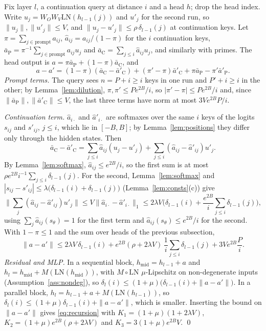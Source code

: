 \documentclass[11pt]{article}
\theoremstyle{definition}
\theoremstyle{remark}
\begin{document}
Fix layer $l$, a continuation query at distance $i$ and a head $h$; drop the head index. Write $u_j=W_OW_V\mathrm{LN}(h_{l-1}(j))$ and $u'_j$ for the second run, so $\|u_j\|,\|u'_j\|\le V$, and $\|u_j-u'_j\|\le\rho\,\delta_{l-1}(j)$ at continuation keys. Let $\pi=\sum_{j\in\text{prompt}}a_{ij}$, $\hat a_{ij}=a_{ij}/(1-\pi)$ for the $i$ continuation keys, $\bar a_{\mathrm P}=\pi^{-1}\sum_{j\in\text{prompt}}a_{ij}u_j$ and $\bar a_{\mathrm C}=\sum_{j\le i}\hat a_{ij}u_j$, and similarly with primes. The head output is $a=\pi\bar a_{\mathrm P}+(1-\pi)\bar a_{\mathrm C}$, and
\[
a-a'=(1-\pi)(\bar a_{\mathrm C}-\bar a'_{\mathrm C})+(\pi'-\pi)\bar a'_{\mathrm C}+\pi\bar a_{\mathrm P}-\pi'\bar a'_{\mathrm P}.
\]
\emph{Prompt terms.} The query sees $n=P+i\ge i$ keys in one run and $P'+i\ge i$ in the other; by Lemma~\ref{lem:dilution}, $\pi,\pi'\le Pe^{2B}/i$, so $|\pi'-\pi|\le Pe^{2B}/i$ and, since $\|\bar a_{\mathrm P}\|,\|\bar a'_{\mathrm C}\|\le V$, the last three terms have norm at most $3Ve^{2B}P/i$.

\emph{Continuation term.} $\hat a_{i\cdot}$ and $\hat a'_{i\cdot}$ are softmaxes over the same $i$ keys of the logits $s_{ij}$ and $s'_{ij}$, $j\le i$, which lie in $[-B,B]$; by Lemma~\ref{lem:positions} they differ only through the hidden states. Then
\[
\bar a_{\mathrm C}-\bar a'_{\mathrm C}=\sum_{j\le i}\hat a_{ij}(u_j-u'_j)+\sum_{j\le i}(\hat a_{ij}-\hat a'_{ij})u'_j .
\]
By Lemma~\ref{lem:softmax}, $\hat a_{ij}\le e^{2B}/i$, so the first sum is at most $\rho e^{2B}i^{-1}\sum_{j\le i}\delta_{l-1}(j)$. For the second, Lemma~\ref{lem:softmax} and $|s_{ij}-s'_{ij}|\le\lambda\big(\delta_{l-1}(i)+\delta_{l-1}(j)\big)$ (Lemma~\ref{lem:consts}(c)) give
\[
\Big\|\sum_j(\hat a_{ij}-\hat a'_{ij})u'_j\Big\|\le V\|\hat a_{i\cdot}-\hat a'_{i\cdot}\|_1\le2\lambda V\Big(\delta_{l-1}(i)+\frac{e^{2B}}{i}\sum_{j\le i}\delta_{l-1}(j)\Big),
\]
using $\sum_j\hat a_{ij}(s_\theta)=1$ for the first term and $\hat a_{ij}(s_\theta)\le e^{2B}/i$ for the second. With $1-\pi\le1$ and the sum over heads of the previous subsection,
\[
\|a-a'\|\le2\lambda V\,\delta_{l-1}(i)+e^{2B}(\rho+2\lambda V)\,\frac1i\sum_{j\le i}\delta_{l-1}(j)+3Ve^{2B}\frac Pi .
\]
\emph{Residual and MLP.} In a sequential block, $h_{\mathrm{mid}}=h_{l-1}+a$ and $h_l=h_{\mathrm{mid}}+M(\mathrm{LN}(h_{\mathrm{mid}}))$, with $M\circ\mathrm{LN}$ $\mu$-Lipschitz on non-degenerate inputs (Assumption~\ref{ass:nondeg}), so $\delta_l(i)\le(1+\mu)\big(\delta_{l-1}(i)+\|a-a'\|\big)$. In a parallel block, $h_l=h_{l-1}+a+M(\mathrm{LN}(h_{l-1}))$, so $\delta_l(i)\le(1+\mu)\delta_{l-1}(i)+\|a-a'\|$, which is smaller. Inserting the bound on $\|a-a'\|$ gives \eqref{eq:recursion} with $K_1=(1+\mu)(1+2\lambda V)$, $K_2=(1+\mu)e^{2B}(\rho+2\lambda V)$ and $K_3=3(1+\mu)e^{2B}V$. \qed
\end{document}

